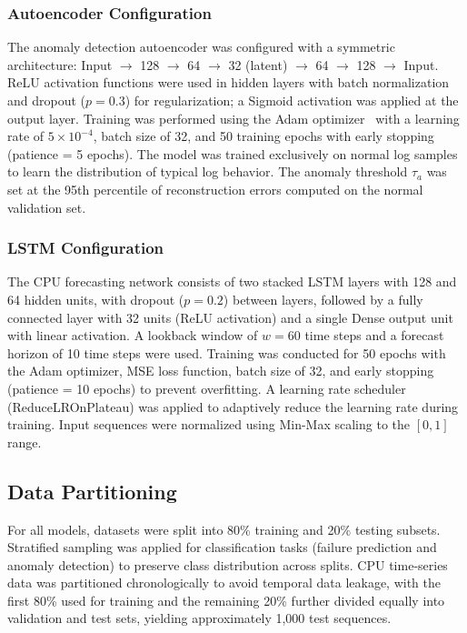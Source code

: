 \documentclass[sn-nature]{sn-jnl}
\theoremstyle{thmstyleone}
\theoremstyle{thmstyletwo}
\theoremstyle{thmstylethree}
\begin{document}
\subsubsection{Autoencoder Configuration}
The anomaly detection autoencoder was configured with a symmetric architecture: Input $\rightarrow$ 128 $\rightarrow$ 64 $\rightarrow$ 32 (latent) $\rightarrow$ 64 $\rightarrow$ 128 $\rightarrow$ Input.
ReLU activation functions were used in hidden layers with batch normalization and dropout ($p=0.3$) for regularization;
a Sigmoid activation was applied at the output layer. Training was performed using the Adam optimizer~\cite{kingma2015adam} with a learning rate of $5 \times 10^{-4}$, batch size of 32, and 50 training epochs with early stopping (patience = 5 epochs).
The model was trained exclusively on normal log samples to learn the distribution of typical log behavior.
The anomaly threshold $\tau_a$ was set at the 95th percentile of reconstruction errors computed on the normal validation set.

\subsubsection{LSTM Configuration}
The CPU forecasting network consists of two stacked LSTM layers with 128 and 64 hidden units, with dropout ($p=0.2$) between layers, followed by a fully connected layer with 32 units (ReLU activation) and a single Dense output unit with linear activation.
A lookback window of $w = 60$ time steps and a forecast horizon of 10 time steps were used.
Training was conducted for 50 epochs with the Adam optimizer, MSE loss function, batch size of 32, and early stopping (patience = 10 epochs) to prevent overfitting.
A learning rate scheduler (ReduceLROnPlateau) was applied to adaptively reduce the learning rate during training.
Input sequences were normalized using Min-Max scaling to the $[0, 1]$ range.

\subsection{Data Partitioning}\label{subsec:partition}

For all models, datasets were split into 80\% training and 20\% testing subsets.
Stratified sampling was applied for classification tasks (failure prediction and anomaly detection) to preserve class distribution across splits.
CPU time-series data was partitioned chronologically to avoid temporal data leakage, with the first 80\% used for training and the remaining 20\% further divided equally into validation and test sets, yielding approximately 1,000 test sequences.
\end{document}
